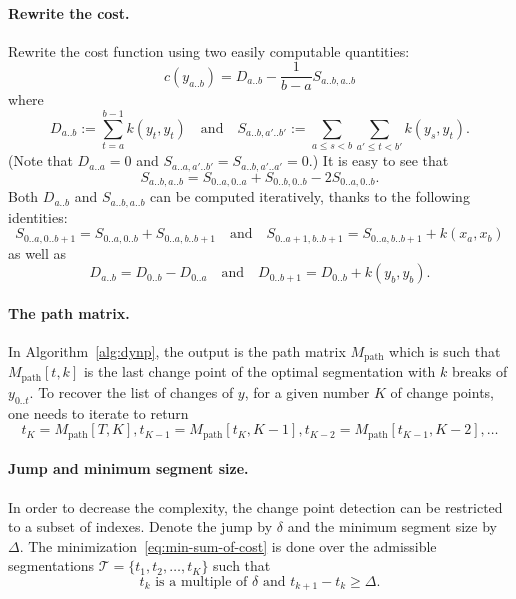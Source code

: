\documentclass[12pt]{article}
\newcommand{\TT}{\mathcal{T}}
\begin{document}
\paragraph{Rewrite the cost.}
Rewrite the cost function using two easily computable quantities:
\begin{equation}
    c(y_{a..b}) = D_{a..b} - \frac{1}{b-a} S_{a..b, a..b}
\end{equation}
where
\begin{equation}
    D_{a..b} := \sum_{t=a}^{b-1} k(y_t, y_t) \quad\text{and}\quad S_{a..b, a'..b'} := \sum_{a\leq s <b} \sum_{a'\leq t <b'} k(y_s, y_t).
\end{equation}
(Note that $D_{a..a}=0$ and $S_{a..a, a'..b'}=S_{a..b, a'..a'}=0$.)
It is easy to see that
\begin{equation}
    S_{a..b, a..b} = S_{0..a, 0..a} + S_{0..b, 0..b} - 2S_{0..a, 0..b}.
\end{equation}
Both $D_{a..b}$ and $S_{a..b, a..b}$ can be computed iteratively, thanks to the following identities:
\begin{equation}
    S_{0..a, 0..b+1} = S_{0..a, 0..b} + S_{0..a, b..b+1}\quad\text{and}\quad S_{0..a+1, b..b+1} = S_{0..a, b..b+1} + k(x_a, x_b)
\end{equation}
as well as
\begin{equation}
    D_{a..b} = D_{0..b} - D_{0..a}\quad\text{and}\quad D_{0..b+1} = D_{0..b} + k(y_b, y_b).
\end{equation}

\paragraph{The path matrix.}
In Algorithm~\ref{alg:dynp}, the output is the path matrix $M_{\text{path}}$ which is such that $M_{\text{path}}[t, k]$ is the last change point of the optimal segmentation with $k$ breaks of $y_{0..t}$.
To recover the list of changes of $y$, for a given number $K$ of change points, one needs to iterate to return
\begin{equation*}
    t_K = M_{\text{path}}[T, K], t_{K-1}=M_{\text{path}}[t_K, K-1], t_{K-2}=M_{\text{path}}[t_{K-1}, K-2], \dots  
\end{equation*}

\paragraph{Jump and minimum segment size.}
In order to decrease the complexity, the change point detection can be restricted to a subset of indexes.
Denote the jump by $\delta$ and the minimum segment size by $\Delta$.
The minimization~\eqref{eq:min-sum-of-cost} is done over the admissible segmentations $\TT=\{t_1,t_2,\dots,t_K\}$ such that
\begin{equation}
    t_k \text{ is a multiple of }\delta\text{ and } t_{k+1}-t_k \geq \Delta.
\end{equation}
\end{document}
